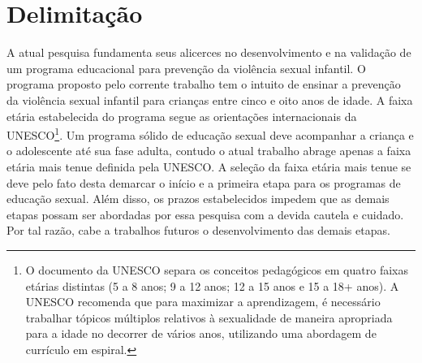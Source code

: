





\section{Delimitação}\label{sec:Escopo}

A atual pesquisa fundamenta seus alicerces no desenvolvimento e na validação de um programa educacional para prevenção da violência sexual infantil. O programa proposto pelo corrente trabalho tem o intuito de ensinar a prevenção da violência sexual infantil para crianças entre cinco e oito anos de idade. A faixa etária estabelecida do programa segue as orientações internacionais da UNESCO\footnote{O documento da UNESCO separa os conceitos pedagógicos em quatro faixas etárias distintas (5 a 8 anos; 9 a 12 anos; 12 a 15 anos e 15 a 18+ anos). A UNESCO recomenda que para maximizar a aprendizagem, é necessário trabalhar tópicos múltiplos relativos à sexualidade de maneira apropriada para a idade no decorrer de vários anos, utilizando uma abordagem de currículo em espiral.}. Um programa sólido de educação sexual deve acompanhar a criança e o adolescente até sua fase adulta, contudo o atual trabalho abrage apenas a faixa etária mais tenue definida pela UNESCO. A seleção da faixa etária mais tenue se deve pelo fato desta demarcar o início e a primeira etapa para os programas de educação sexual. Além disso, os prazos estabelecidos impedem que as demais etapas possam ser abordadas por essa pesquisa com a devida cautela e cuidado. Por tal razão, cabe a trabalhos futuros o desenvolvimento das demais etapas.

